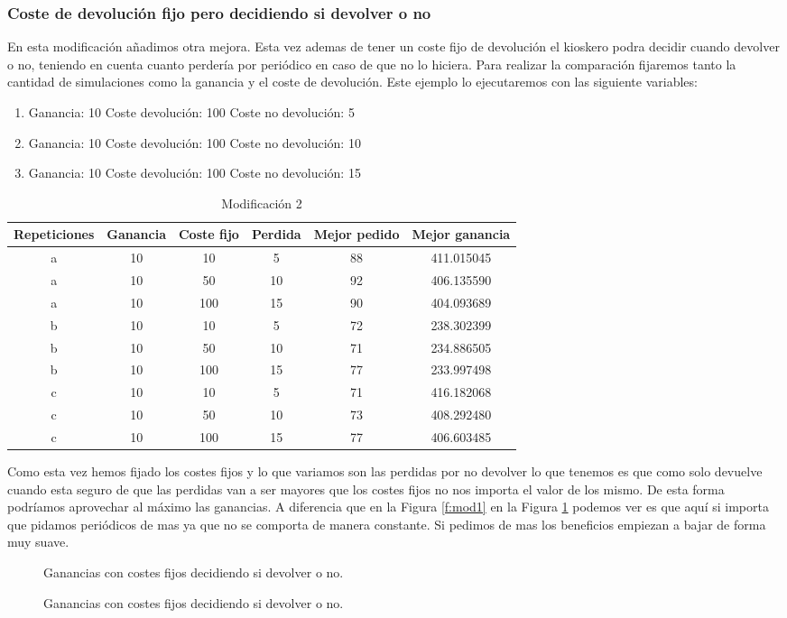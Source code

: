 \documentclass[12pt,a4paper]{article}
\begin{document}
\subsubsection{Coste de devolución fijo pero decidiendo si devolver o no}
En esta modificación añadimos otra mejora. Esta vez ademas de tener un coste fijo de devolución el kioskero podra decidir cuando devolver o no, teniendo en cuenta cuanto perdería por periódico en caso de que no lo hiciera. Para realizar la comparación fijaremos tanto la cantidad de simulaciones como la ganancia y el coste de devolución.
Este ejemplo lo ejecutaremos con las siguiente variables:
\begin{enumerate}
	\item Ganancia: 10 Coste devolución: 100 Coste no devolución: 5
	\item Ganancia: 10 Coste devolución: 100 Coste no devolución: 10
	\item Ganancia: 10 Coste devolución: 100 Coste no devolución: 15
\end{enumerate}
\begin{table}[H]
	\begin{tabular}{cccccc} \toprule
		{Repeticiones} & {Ganancia} & {Coste fijo}&{Perdida} &  {Mejor pedido} & {Mejor ganancia} \\ \midrule
		a &10  & 10 & 5 &88 & 411.015045 \\
		a &10  & 50  & 10 &92 &406.135590\\
		a &10  & 100 &15 & 90 & 404.093689 \\
		\midrule
		b &10  & 10 & 5 &72 & 238.302399 \\
		b &10  & 50 & 10 &71 & 234.886505 \\
		b &10  & 100 & 15 &77 & 233.997498 \\  
		\midrule
		c &10  & 10&5 & 71 & 416.182068\\
		c &10  & 50&10 & 73 & 408.292480 \\
		c &10  & 100&15 & 77 & 406.603485\\
		\midrule	
	\end{tabular}
	\caption{Modificación 2} \label{tab:mod2}
\end{table}
Como esta vez hemos fijado los costes fijos y lo que variamos son las perdidas por no devolver lo que tenemos es que como solo devuelve cuando esta seguro de que las perdidas van a ser mayores que los costes fijos no nos importa el valor de los mismo. De esta forma podríamos aprovechar al máximo las ganancias. A diferencia que en la Figura \ref{f:mod1} en la Figura \ref{f:mod2} podemos ver es que aquí si importa que pidamos periódicos de mas ya que no se comporta de manera constante. Si pedimos de mas los beneficios empiezan a bajar de forma muy suave. 
\begin{figure}[H]
	\centering
	\caption{Ganancias con costes fijos decidiendo si devolver o no.}
	\caption{Ganancias con costes fijos decidiendo si devolver o no.}
	\label{f:mod2}
\end{figure}
\end{document}
